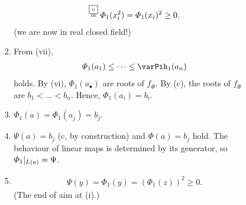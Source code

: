 \documentclass[9pt]{ltjsarticle}
\begin{document}
\begin{itemize}
\begin{enumerate}
\begin{enumerate}
\begin{enumerate}
\begin{align}
          \overset{\text{\fbox{\tiny ii}}}{=}
          \varPhi_1(x_i^2)
          =
          \varPhi_1(x_i)^2
          \ge 0.
        \end{align}
        (we are now in real closed field!)
        \item
        From (vii),
        \begin{align}
          \varPhi_1(a_1) \le \dots \le \varPih_1(a_n)
        \end{align}
        holds.  By (vi), $\varPhi_1(a_\bullet)$ are
        roots of $f_\varPhi$.
        By (c), the roots of $f_\varPhi$ are $b_1 < \dots < b_n$.
        Hence,  $\varPhi_1(a_i) = b_i$.
        \item
        $\varPhi_1(a) = \varPhi_1(a_j) = b_j$.
        \item
        $\Psi(a) = b_j$ (c, by construction) and
        $\varPhi(a) = b_j$ hold.
        The behaviour of linear maps is determined by its
        generator, so $\varPhi_1|_{L(a)} = \Psi$.
        \item
        \begin{align}
          \Psi(y) = \varPhi_1(y) = (\varPhi_1(z))^2 \ge 0.
        \end{align}
        (The end of aim at (i).)


\end{enumerate}
\end{enumerate}
\end{enumerate}
\end{itemize}
\end{document}
